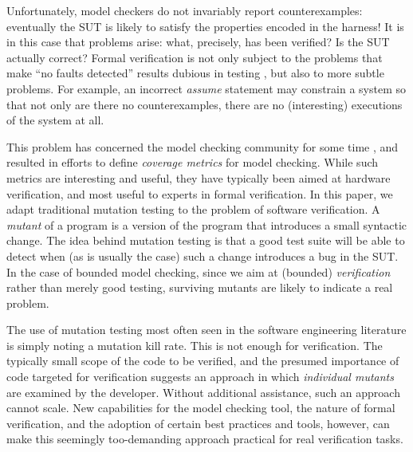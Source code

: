 \documentclass[conference]{IEEEtran}
\begin{document}
Unfortunately, model checkers do not invariably report
counterexamples: eventually the SUT is likely to satisfy the
properties encoded in the harness!  It is in this case that problems
arise: what, precisely, has been verified?  Is the SUT actually correct?
Formal verification is not only subject to the problems that make
``no faults detected'' results dubious in testing \cite{WODA09,CovDisc}, but
also to more subtle problems.  For example, an incorrect \emph{assume}
statement may constrain a system so that not only are there no
counterexamples, there are no (interesting) executions of the system at
all.

This problem has concerned the model checking community for some time
\cite{Hoskote,PracticalCov}, and resulted in efforts to define \emph{coverage
  metrics} for model checking.  While such metrics are interesting and
useful, they have typically been aimed at hardware
verification, and most useful to experts in
formal verification.  In this paper, we adapt traditional mutation
testing \cite{mutation1,mutation2} to the problem of software
verification.  A \emph{mutant} of a program is a version of the program that
introduces a small syntactic change.  The idea behind mutation testing
is that a good test suite will be able to detect when (as is usually
the case) such a change introduces a bug in the SUT.  In the case of
bounded model checking, since we aim at (bounded) \emph{verification} rather
than merely good testing, surviving mutants are
likely to indicate a real problem.

The use of mutation testing most often seen in the software
engineering literature is simply noting a mutation kill rate. This is
not enough for verification.  The typically small scope of the code to
be verified, and the presumed importance of code targeted for
verification suggests an approach in which \emph{individual mutants}
are examined by the developer.  Without additional assistance, such an
approach cannot scale.  New capabilities for the model
checking tool, the nature of formal verification, and the adoption of
certain best practices and tools, however, can make this seemingly too-demanding approach
practical for real verification tasks.
\end{document}
